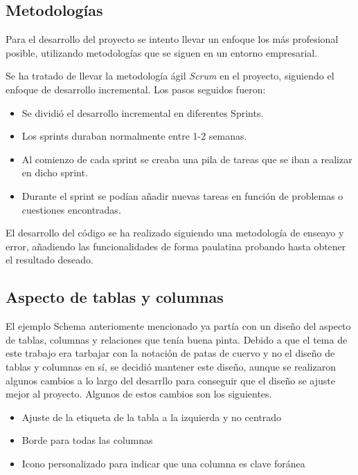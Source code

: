 \subsection{Metodologías}

Para el desarrollo del proyecto se intento llevar un enfoque los más profesional posible, utilizando metodologías que se siguen en un entorno empresarial.

Se ha tratado de llevar la metodología ágil \emph{Scrum} en el proyecto, siguiendo el enfoque de desarrollo incremental. Los pasos seguidos fueron:
\begin{itemize}
    \item Se dividió el desarrollo incremental en diferentes Sprints.
    \item Los sprints duraban normalmente entre 1-2 semanas.
    \item Al comienzo de cada sprint se creaba una pila de tareas que se iban a realizar en dicho sprint.
    \item Durante el sprint se podían añadir nuevas tareas en función de problemas o cuestiones encontradas.
\end{itemize}

El desarrollo del código se ha realizado siguiendo una metodología de enseayo y error, añadiendo las funcionalidades de forma paulatina probando hasta obtener el resultado deseado.

\subsection{Aspecto de tablas y columnas}

El ejemplo Schema anteriomente mencionado ya partía con un diseño del aspecto de tablas, columnas y relaciones que tenía buena pinta. Debido a que el tema de este trabajo era tarbajar con la notación de patas de cuervo y no el diseño de tablas y columnas en sí, se decidió mantener este diseño, aunque se realizaron algunos cambios a lo largo del desarrllo para conseguir que el diseño se ajuste mejor al proyecto. Algunos de estos cambios son los siguientes.
\begin{itemize}
    \item Ajuste de la etiqueta de la tabla a la izquierda y no centrado
    \item Borde para todas las columnas
    \item Icono personalizado para indicar que una columna es clave foránea
\end{itemize}

